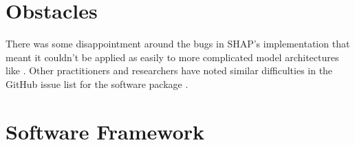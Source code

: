 \documentclass[main]{subfiles}
\begin{document}
\section{Obstacles}

There was some disappointment around the bugs in SHAP's implementation that meant it couldn't be applied as easily to more complicated model architectures like . Other practitioners and researchers have noted similar difficulties in the GitHub issue list for the software package \cite{shaprepo}.


\section{Software Framework}




\end{document}
